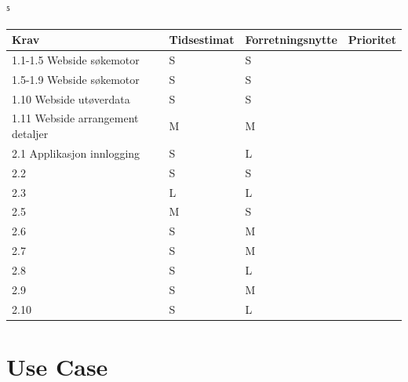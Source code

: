 ⁵\documentclass[norsk]{article}
\begin{document}
\begin{table}[ht]
\begin{tabular}{|l|l|l|l|}
\hline
Krav & Tidsestimat & Forretningsnytte & Prioritet           \\ \hline
1.1-1.5 Webside søkemotor            & S    & S     &       \\ \hline
1.5-1.9 Webside søkemotor            & S    & S     &       \\ \hline
1.10    Webside utøverdata           & S    & S     &       \\ \hline
1.11    Webside arrangement detaljer & M    & M     &       \\ \hline
2.1     Applikasjon innlogging       & S    & L     &       \\
\hline
2.2  & S           & S      &       \\ \hline
2.3  & L           & L      &       \\ \hline
2.5  & M           & S      &       \\ \hline
2.6  & S           & M      &       \\ \hline
2.7  & S           & M      &       \\ \hline
2.8  & S           & L      &       \\ \hline
2.9  & S           & M      &       \\ \hline
2.10 & S           & L      &       \\ \hline

\end{tabular}
\end{table}

\section{Use Case} %
\end{document}
